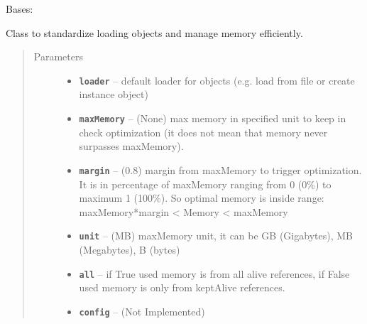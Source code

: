 \documentclass[letterpaper,10pt,english]{sphinxmanual}
\begin{document}
\begin{fulllineitems}
\label{RRtoolbox.lib:RRtoolbox.lib.image.loaderDict}
Bases: {\hyperref[RRtoolbox.lib:RRtoolbox.lib.cache.resourceManager]{\emph{}}}

Class to standardize loading objects and manage memory efficiently.
\begin{quote}\begin{description}
\item[{Parameters}] \leavevmode\begin{itemize}
\item {} 
\textbf{\texttt{loader}} -- default loader for objects (e.g. load from file or create instance object)

\item {} 
\textbf{\texttt{maxMemory}} -- (None) max memory in specified unit to keep in check optimization (it does
not mean that memory never surpasses maxMemory).

\item {} 
\textbf{\texttt{margin}} -- (0.8) margin from maxMemory to trigger optimization.
It is in percentage of maxMemory ranging from 0 (0\%) to maximum 1 (100\%).
So optimal memory is inside range: maxMemory*margin \textless{} Memory \textless{} maxMemory

\item {} 
\textbf{\texttt{unit}} -- (MB) maxMemory unit, it can be GB (Gigabytes), MB (Megabytes), B (bytes)

\item {} 
\textbf{\texttt{all}} -- if True used memory is from all alive references,
if False used memory is only from keptAlive references.

\item {} 
\textbf{\texttt{config}} -- (Not Implemented)

\end{itemize}

\end{description}\end{quote}

\begin{fulllineitems}
\label{RRtoolbox.lib:RRtoolbox.lib.image.loaderDict.register}
\end{fulllineitems}


\end{fulllineitems}
\end{document}
